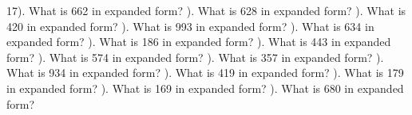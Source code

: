 \documentclass{article}%
\begin{document}
17). What is 662 in expanded form?%
\newline%
\newline%
). What is 628 in expanded form?%
\newline%
\newline%
). What is 420 in expanded form?%
\newline%
\newline%
). What is 993 in expanded form?%
\newline%
\newline%
). What is 634 in expanded form?%
\newline%
\newline%
). What is 186 in expanded form?%
\newline%
\newline%
). What is 443 in expanded form?%
\newline%
\newline%
). What is 574 in expanded form?%
\newline%
\newline%
). What is 357 in expanded form?%
\newline%
\newline%
). What is 934 in expanded form?%
\newline%
\newline%
). What is 419 in expanded form?%
\newline%
\newline%
). What is 179 in expanded form?%
\newline%
\newline%
). What is 169 in expanded form?%
\newline%
\newline%
). What is 680 in expanded form?%
\newline%
\newline%
\newline%
\end{document}
